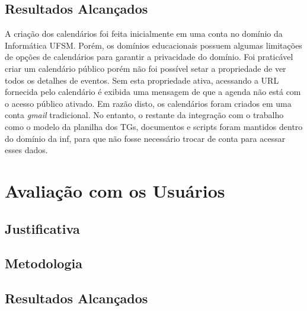 \subsection{Resultados Alcançados}
A criação dos calendários foi feita inicialmente em uma conta no domínio da Informática UFSM. Porém, os domínios educacionais possuem algumas limitações de opções de calendários para garantir a privacidade do domínio. Foi praticável criar um calendário público porém não foi possível setar a propriedade de ver todos os detalhes de eventos. Sem esta propriedade ativa, acessando a URL fornecida pelo calendário é exibida uma mensagem de que a agenda não está com o acesso público ativado. Em razão disto, os calendários foram criados em uma conta \emph{gmail} tradicional. No entanto, o restante da integração com o trabalho como o modelo da planilha dos TGs, documentos e scripts foram mantidos dentro do domínio da inf, para que não fosse necessário trocar de conta para acessar esses dados.


\section{Avaliação com os Usuários}
\subsection{Justificativa}

\subsection{Metodologia}
\subsection{Resultados Alcançados}